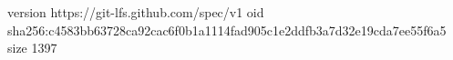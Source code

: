 version https://git-lfs.github.com/spec/v1
oid sha256:c4583bb63728ca92cac6f0b1a1114fad905c1e2ddfb3a7d32e19cda7ee55f6a5
size 1397
